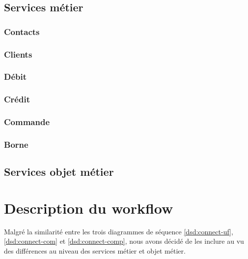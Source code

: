 \subsection{Services métier}
% 

\subsubsection{Contacts}
\subsubsection{Clients}
\subsubsection{Débit}
\subsubsection{Crédit}
\subsubsection{Commande}
\subsubsection{Borne}

\subsection{Services objet métier}

\section{Description du workflow}
Malgré la similarité entre les trois diagrammes de séquence
\ref{dsd:connect-uf}, \ref{dsd:connect-com} et \ref{dsd:connect-comp}, nous
avons décidé de les inclure au vu des différences au niveau des services métier
et objet métier.

